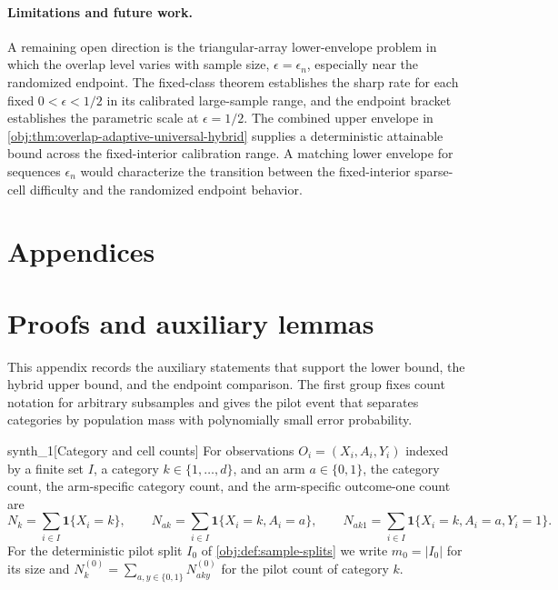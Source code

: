 \documentclass[11pt]{article}
\begin{document}
\paragraph{Limitations and future work.}
A remaining open direction is the triangular-array lower-envelope problem in which the overlap level varies with sample size, \(\epsilon=\epsilon_n\), especially near the randomized endpoint. The fixed-class theorem establishes the sharp rate for each fixed \(0<\epsilon<1/2\) in its calibrated large-sample range, and the endpoint bracket establishes the parametric scale at \(\epsilon=1/2\). The combined upper envelope in \cref{obj:thm:overlap-adaptive-universal-hybrid} supplies a deterministic attainable bound across the fixed-interior calibration range. A matching lower envelope for sequences \(\epsilon_n\) would characterize the transition between the fixed-interior sparse-cell difficulty and the randomized endpoint behavior.


\appendix

\section*{Appendices}

\section{Proofs and auxiliary lemmas}

This appendix records the auxiliary statements that support the lower bound, the hybrid upper bound, and the endpoint comparison. The first group fixes count notation for arbitrary subsamples and gives the pilot event that separates categories by population mass with polynomially small error probability.

\begin{definitionv}{synth_1}[Category and cell counts]
For observations \(O_i=(X_i,A_i,Y_i)\) indexed by a finite set \(I\), a category \(k\in\{1,\ldots,d\}\), and an arm \(a\in\{0,1\}\), the category count, the arm-specific category count, and the arm-specific outcome-one count are \[ N_k=\sum_{i\in I}\mathbf 1\{X_i=k\},\qquad N_{ak}=\sum_{i\in I}\mathbf 1\{X_i=k,A_i=a\},\qquad N_{ak1}=\sum_{i\in I}\mathbf 1\{X_i=k,A_i=a,Y_i=1\}. \] For the deterministic pilot split \(I_0\) of \cref{obj:def:sample-splits} we write \(m_0=|I_0|\) for its size and \(N_k^{(0)}=\sum_{a,y\in\{0,1\}}N^{(0)}_{aky}\) for the pilot count of category \(k\).
\end{definitionv}
\end{document}
